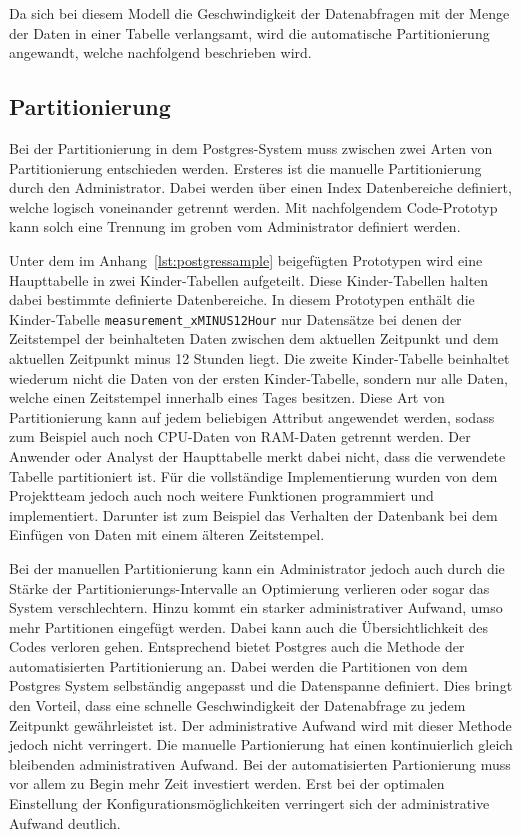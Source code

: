 Da sich bei diesem Modell die Geschwindigkeit der Datenabfragen mit der Menge
der Daten in einer Tabelle verlangsamt, wird die automatische Partitionierung
angewandt, welche nachfolgend beschrieben wird.
\nl%

\subsection{Partitionierung}
\label{subsec:postgres_partition}
Bei der Partitionierung in dem Postgres\hyp{}System muss zwischen zwei Arten
von Partitionierung entschieden werden. Ersteres ist die manuelle
Partitionierung durch den Administrator. Dabei werden über einen Index
Datenbereiche definiert, welche logisch voneinander getrennt werden. Mit
nachfolgendem Code\hyp{}Prototyp kann solch eine Trennung im groben vom
Administrator definiert werden.

Unter dem im Anhang~\ref{lst:postgressample} beigefügten Prototypen wird eine
Haupttabelle in zwei Kinder\hyp{}Tabellen aufgeteilt. Diese
Kinder\hyp{}Tabellen halten dabei bestimmte definierte Datenbereiche. In diesem
Prototypen enthält die Kinder\hyp{}Tabelle \texttt{measurement\_xMINUS12Hour}
nur Datensätze bei denen der Zeitstempel der beinhalteten Daten zwischen dem
aktuellen Zeitpunkt und dem aktuellen Zeitpunkt minus 12 Stunden liegt. Die
zweite Kinder\hyp{}Tabelle beinhaltet wiederum nicht die Daten von der ersten
Kinder\hyp{}Tabelle, sondern nur alle Daten, welche einen Zeitstempel innerhalb
eines Tages besitzen. Diese Art von Partitionierung kann auf jedem beliebigen
Attribut angewendet werden, sodass zum Beispiel auch noch CPU\hyp{}Daten von
RAM\hyp{}Daten getrennt werden. Der Anwender oder Analyst der Haupttabelle
merkt dabei nicht, dass die verwendete Tabelle partitioniert ist. Für die
vollständige Implementierung wurden von dem Projektteam jedoch auch noch
weitere Funktionen programmiert und implementiert. Darunter ist zum Beispiel
das Verhalten der Datenbank bei dem Einfügen von Daten mit einem älteren
Zeitstempel.

Bei der manuellen Partitionierung kann ein Administrator jedoch auch durch die
Stärke der Partitionierungs\hyp{}Intervalle an Optimierung verlieren oder sogar
das System verschlechtern. Hinzu kommt ein starker administrativer Aufwand,
umso mehr \gls{Partitionen} eingefügt werden. Dabei kann auch die
Übersichtlichkeit des Codes verloren gehen. Entsprechend bietet Postgres auch
die Methode der automatisierten Partitionierung an. Dabei werden die
\gls{Partitionen} von dem Postgres System selbständig angepasst und die
Datenspanne definiert. Dies bringt den Vorteil, dass eine schnelle
Geschwindigkeit der Datenabfrage zu jedem Zeitpunkt gewährleistet ist. Der
administrative Aufwand wird mit dieser Methode jedoch nicht verringert. Die
manuelle Partionierung hat einen kontinuierlich gleich bleibenden
administrativen Aufwand. Bei der automatisierten Partionierung muss vor allem
zu Begin mehr Zeit investiert werden. Erst bei der optimalen Einstellung der
Konfigurationsmöglichkeiten verringert sich der administrative Aufwand
deutlich.

